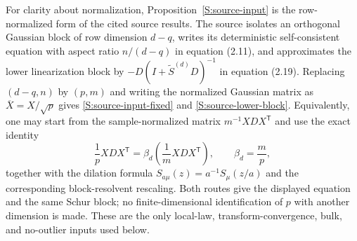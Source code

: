 For clarity about normalization, Proposition~\ref{S:source-input} is the
row-normalized form of the cited source results.  The source isolates an
orthogonal Gaussian block of row dimension $d-q$, writes its deterministic
self-consistent equation with aspect ratio $n/(d-q)$ in equation (2.11), and
approximates the lower linearization block by
$-D(I+\widetilde S^{(d)}D)^{-1}$ in equation (2.19).  Replacing
$(d-q,n)$ by $(p,m)$ and writing the normalized Gaussian matrix as
$\overline X=X/\sqrt p$ gives \eqref{S:source-input-fixed} and
\eqref{S:source-lower-block}.  Equivalently, one may start from the
sample-normalized matrix $m^{-1}XDX^{\mathsf T}$ and use the exact identity
\begin{equation}
 \frac1pXDX^{\mathsf T}
 =\beta_d\left(\frac1mXDX^{\mathsf T}\right),
 \qquad \beta_d=\frac mp,
\end{equation}
together with the dilation formula
$S_{a\mu}(z)=a^{-1}S_\mu(z/a)$ and the corresponding block-resolvent
rescaling.  Both routes give the displayed equation and the same Schur block;
no finite-dimensional identification of $p$ with another dimension is made.
These are the only local-law, transform-convergence, bulk, and no-outlier
inputs used below.

